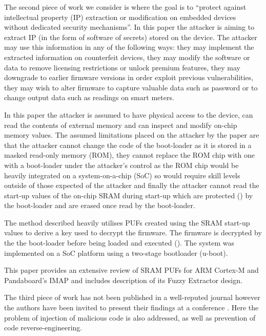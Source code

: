 The second piece of work we consider is \cite{Schaller2014} where the goal is to ``protect against intellectual property (IP) extraction or modification on embedded devices without dedicated security mechanisms''. In this paper the attacker is aiming to extract IP (in the form of software of secrets) stored on the device. The attacker may use this information in any of the following ways: they may implement the extracted information on counterfeit devices, they may modify the software or data to remove licensing restrictions or unlock premium features, they may downgrade to earlier firmware versions  in order exploit previous vulnerabilities, they may wish to alter firmware to capture valuable data such as password or to change output data such as readings on smart meters.

In this paper the attacker is assumed to have physical access to the device, can read the contents of external memory and can inspect and modify on-chip memory values. The assumed limitations placed on the attacker by the paper are that the attacker cannot change the code of the boot-loader as it is stored in a masked read-only memory (ROM), they cannot replace the ROM chip with one with a boot-loader under the attacker's control as the ROM chip would be heavily integrated on a system-on-a-chip (SoC) so would require skill levels outside of those expected of the attacker and finally the attacker cannot read the start-up values of the on-chip SRAM during start-up which are protected () by the boot-loader and are erased once read by the boot-loader.

The method described heavily utilises PUFs created using the SRAM start-up values to derive a key used to decrypt the firmware. The firmware is decrypted by the the boot-loader before being loaded and executed (). The system was implemented on a SoC platform using a two-stage bootloader (u-boot).

This paper provides an extensive review of SRAM PUFs for ARM Cortex-M and Pandaboard's IMAP and includes description of its Fuzzy Extractor design.


 The third piece of work \cite{Kleber2015} has not been published in a well-reputed journal however the authors have been invited to present their findings at a conference . Here the problem of injection of malicious code is also addressed, as well as prevention of code reverse-engineering.

